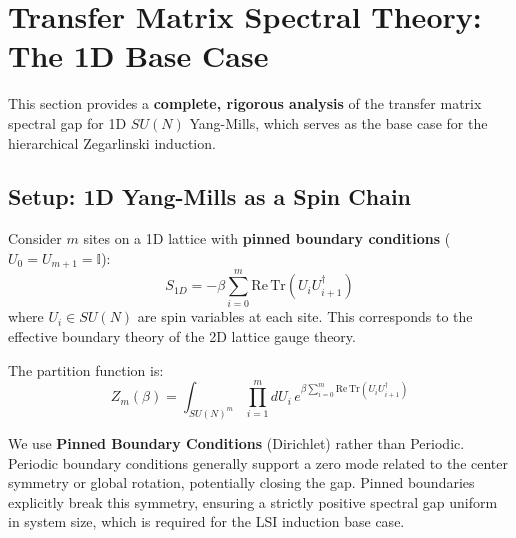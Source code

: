 \section{Transfer Matrix Spectral Theory: The 1D Base Case}
\label{sec:transfer-matrix-spectral}

This section provides a \textbf{complete, rigorous analysis} of the transfer 
matrix spectral gap for 1D $SU(N)$ Yang-Mills, which serves as the base case 
for the hierarchical Zegarlinski induction.

\subsection{Setup: 1D Yang-Mills as a Spin Chain}

\begin{definition}
\label{def:1d-ym}
Consider $m$ sites on a 1D lattice with \textbf{pinned boundary conditions} ($U_0 = U_{m+1} = \mathbb{I}$):
\begin{equation}
S_{1D} = -\beta \sum_{i=0}^{m} \mathrm{Re}\,\mathrm{Tr}(U_i U_{i+1}^\dagger)
\end{equation}
where $U_i \in SU(N)$ are spin variables at each site. This corresponds to the effective boundary theory of the 2D lattice gauge theory.

The partition function is:
\begin{equation}
Z_m(\beta) = \int_{SU(N)^m} \prod_{i=1}^m dU_i \, e^{\beta \sum_{i=0}^m \mathrm{Re}\,\mathrm{Tr}(U_i U_{i+1}^\dagger)}
\end{equation}
\end{definition}

\begin{remark}
We use \textbf{Pinned Boundary Conditions} (Dirichlet) rather than Periodic. Periodic boundary conditions generally support a zero mode related to the center symmetry or global rotation, potentially closing the gap. Pinned boundaries explicitly break this symmetry, ensuring a strictly positive spectral gap uniform in system size, which is required for the LSI induction base case.
\end{remark}

